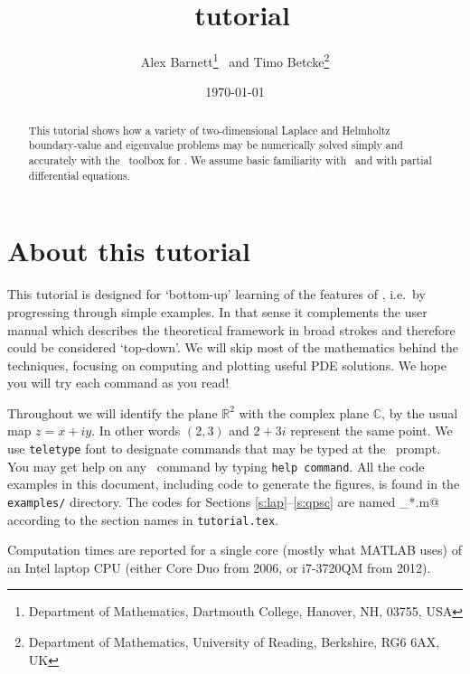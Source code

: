 \documentclass[11pt]{article}
\begin{document}
\title{\mpspack\ tutorial}
\author{Alex Barnett\footnote{Department of Mathematics, Dartmouth College,
Hanover, NH, 03755, USA}
\ and
Timo Betcke\footnote{Department of Mathematics,
University of Reading, Berkshire, RG6 6AX, UK}}
\date{\today}   %

\maketitle
\begin{abstract}
This tutorial shows how a variety of two-dimensional Laplace and Helmholtz
boundary-value and eigenvalue problems
may be numerically solved simply and accurately with the \mpspack\ toolbox
for \matlab. We assume basic familiarity with \matlab\
and with partial differential equations.
\end{abstract}

\setcounter{tocdepth}{2}
\tableofcontents

\section{About this tutorial}

This tutorial is designed for `bottom-up' learning of the features
of \mpspack, i.e.\ by progressing through simple examples.
In that sense it complements the user manual which describes
the theoretical framework in broad strokes and therefore could
be considered `top-down'.
We will skip most of the mathematics behind the techniques,
focusing on computing and plotting useful PDE solutions.
We hope you will try each command as you read!

Throughout we will identify the plane $\mathbb{R}^2$ with the complex
plane $\mathbb{C}$, by the usual map $z=x+iy$. In other words
$(2,3)$ and $2+3i$ represent the same point.
We use {\tt teletype} font to designate commands that may be typed
at the \matlab\ prompt.
You may get help on any \mpspack\ command by typing {\tt help command}.
All the code examples in this document, including code to generate the
figures, is found in the {\tt examples/} directory.
The codes for Sections \ref{s:lap}--\ref{s:qpsc} are named
\verb@tut_*.m@ according to the section names in {\tt tutorial.tex}.

Computation times are reported for a single core (mostly what MATLAB
uses) of an Intel laptop CPU (either Core Duo from 2006, or i7-3720QM
from 2012).











 

\end{document}
